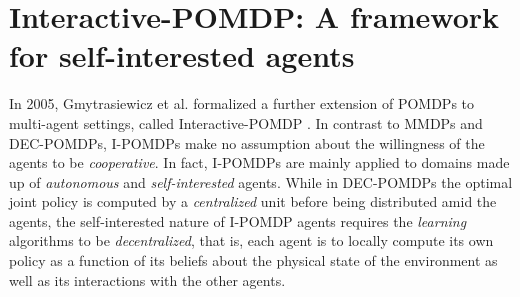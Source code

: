 \section{Interactive-POMDP: A framework for self-interested agents}
\label{sec:ipomdp}
In 2005, Gmytrasiewicz et al. formalized a further extension of POMDPs to multi-agent settings, called Interactive-POMDP \cite{ipomdp}. In contrast to MMDPs and DEC-POMDPs, I-POMDPs make no assumption about the willingness of the agents to be \textit{cooperative}. In fact, I-POMDPs are mainly applied to domains made up of \textit{autonomous} and \textit{self-interested} agents. While in DEC-POMDPs the optimal joint policy is computed by a \textit{centralized} unit before being distributed amid the agents, the self-interested nature of I-POMDP agents requires the \textit{learning} algorithms to be \textit{decentralized}, that is, each agent is to locally compute its own policy as a function of its beliefs about the physical state of the environment as well as its interactions with the other agents.

